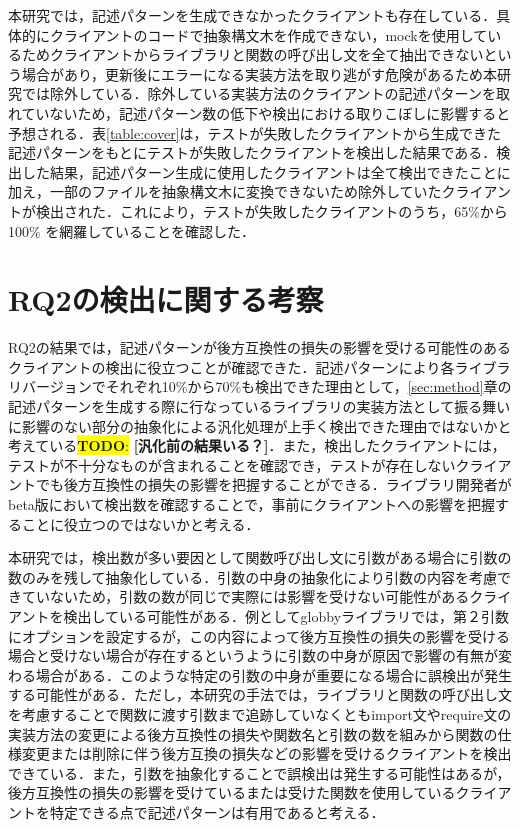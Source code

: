 \documentclass[11pt]{jreport}
\newcommand{\todo}[1]{\colorbox{yellow}{{\bf TODO}:}{\color{red} {\textbf{[#1]}}}}
\begin{document}
本研究では，記述パターンを生成できなかったクライアントも存在している．具体的にクライアントのコードで抽象構文木を作成できない，mockを使用しているためクライアントからライブラリと関数の呼び出し文を全て抽出できないという場合があり，更新後にエラーになる実装方法を取り逃がす危険があるため本研究では除外している．除外している実装方法のクライアントの記述パターンを取れていないため，記述パターン数の低下や検出における取りこぼしに影響すると予想される．表\ref{table:cover}は，テストが失敗したクライアントから生成できた記述パターンをもとにテストが失敗したクライアントを検出した結果である．検出した結果，記述パターン生成に使用したクライアントは全て検出できたことに加え，一部のファイルを抽象構文木に変換できないため除外していたクライアントが検出された．これにより，テストが失敗したクライアントのうち，65\%から100\% を網羅していることを確認した．

\section{RQ2の検出に関する考察}
RQ2の結果では，記述パターンが後方互換性の損失の影響を受ける可能性のあるクライアントの検出に役立つことが確認できた．記述パターンにより各ライブラリバージョンでそれぞれ10\%から70\%も検出できた理由として，\ref{sec:method}章の記述パターンを生成する際に行なっているライブラリの実装方法として振る舞いに影響のない部分の抽象化による汎化処理が上手く検出できた理由ではないかと考えている\todo{汎化前の結果いる？}．また，検出したクライアントには，テストが不十分なものが含まれることを確認でき，テストが存在しないクライアントでも後方互換性の損失の影響を把握することができる．ライブラリ開発者がbeta版において検出数を確認することで，事前にクライアントへの影響を把握することに役立つのではないかと考える．

本研究では，検出数が多い要因として関数呼び出し文に引数がある場合に引数の数のみを残して抽象化している．引数の中身の抽象化により引数の内容を考慮できていないため，引数の数が同じで実際には影響を受けない可能性があるクライアントを検出している可能性がある．例としてglobbyライブラリでは，第２引数にオプションを設定するが，この内容によって後方互換性の損失の影響を受ける場合と受けない場合が存在するというように引数の中身が原因で影響の有無が変わる場合がある．このような特定の引数の中身が重要になる場合に誤検出が発生する可能性がある．ただし，本研究の手法では，ライブラリと関数の呼び出し文を考慮することで関数に渡す引数まで追跡していなくともimport文やrequire文の実装方法の変更による後方互換性の損失や関数名と引数の数を組みから関数の仕様変更または削除に伴う後方互換の損失などの影響を受けるクライアントを検出できている．また，引数を抽象化することで誤検出は発生する可能性はあるが，後方互換性の損失の影響を受けているまたは受けた関数を使用しているクライアントを特定できる点で記述パターンは有用であると考える．
\end{document}
